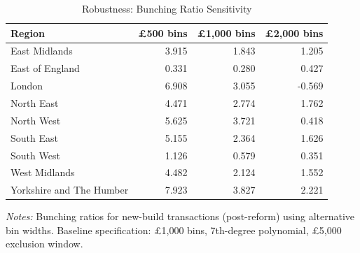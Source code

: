 \begin{table}[htbp]
\centering
\caption{Robustness: Bunching Ratio Sensitivity}
\label{tab:robustness}
\begin{tabular}{lrrr}
\hline\hline
Region & \pounds500 bins & \pounds1,000 bins & \pounds2,000 bins \\
\hline
East Midlands & 3.915 & 1.843 & 1.205 \\
East of England & 0.331 & 0.280 & 0.427 \\
London & 6.908 & 3.055 & -0.569 \\
North East & 4.471 & 2.774 & 1.762 \\
North West & 5.625 & 3.721 & 0.418 \\
South East & 5.155 & 2.364 & 1.626 \\
South West & 1.126 & 0.579 & 0.351 \\
West Midlands & 4.482 & 2.124 & 1.552 \\
Yorkshire and The Humber & 7.923 & 3.827 & 2.221 \\
\hline\hline
\end{tabular}
\begin{minipage}{0.7\textwidth}
\footnotesize \textit{Notes:} Bunching ratios for new-build transactions (post-reform) using alternative bin widths. Baseline specification: \pounds1,000 bins, 7th-degree polynomial, \pounds5,000 exclusion window.
\end{minipage}
\end{table}
